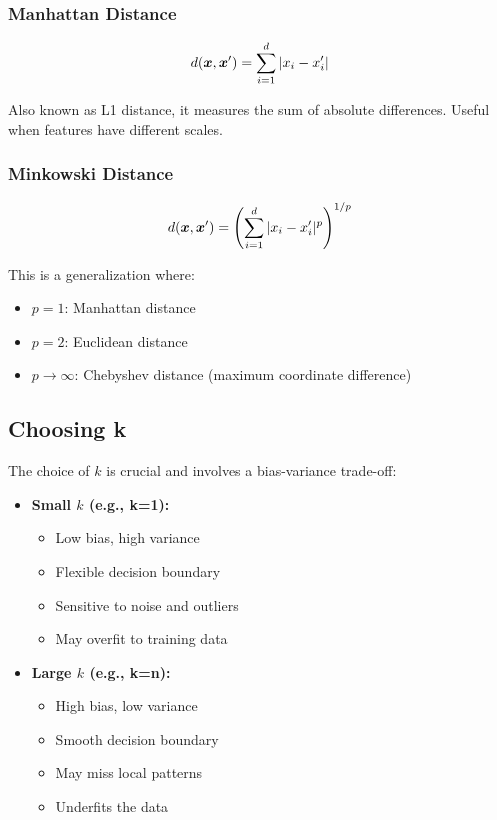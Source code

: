 \subsubsection{Manhattan Distance}

\begin{equation}
d(\boldsymbol{x}, \boldsymbol{x}') = \sum_{i=1}^{d} |x_i - x_i'|
\end{equation}

Also known as L1 distance, it measures the sum of absolute differences. Useful when features have different scales.

\subsubsection{Minkowski Distance}

\begin{equation}
d(\boldsymbol{x}, \boldsymbol{x}') = \left(\sum_{i=1}^{d} |x_i - x_i'|^p\right)^{1/p}
\end{equation}

This is a generalization where:
\begin{itemize}
    \item $p = 1$: Manhattan distance
    \item $p = 2$: Euclidean distance
    \item $p \to \infty$: Chebyshev distance (maximum coordinate difference)
\end{itemize}

\subsection{Choosing k}

The choice of $k$ is crucial and involves a bias-variance trade-off:

\begin{itemize}
    \item \textbf{Small $k$ (e.g., k=1):}
    \begin{itemize}
        \item Low bias, high variance
        \item Flexible decision boundary
        \item Sensitive to noise and outliers
        \item May overfit to training data
    \end{itemize}
    \item \textbf{Large $k$ (e.g., k=n):}
    \begin{itemize}
        \item High bias, low variance
        \item Smooth decision boundary
        \item May miss local patterns
        \item Underfits the data
    \end{itemize}
\end{itemize}

